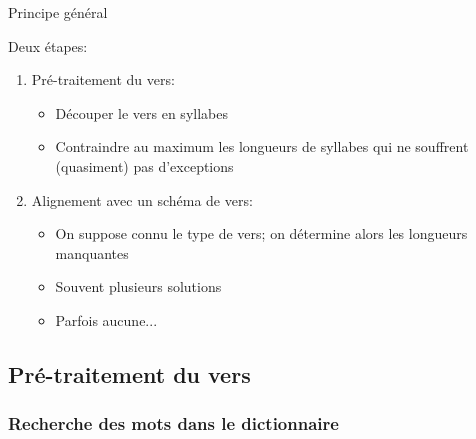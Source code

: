 \documentclass{beamer}
\begin{document}
\begin{frame}{Principe général}

Deux étapes:

\begin{enumerate}
\item Pré-traitement du vers:
\begin{itemize}
\item Découper le vers en syllabes
\item Contraindre au maximum les longueurs de syllabes qui ne souffrent (quasiment) pas d'exceptions
\end{itemize}

\item Alignement avec un schéma de vers:

\begin{itemize}
\item On suppose connu le type de vers; on détermine alors les longueurs manquantes
\item Souvent plusieurs solutions
\item Parfois aucune...
\end{itemize}

\end{enumerate}
\end{frame} %



\subsection{Pré-traitement du vers}

\subsubsection{Recherche des mots dans le dictionnaire}
\end{document}
